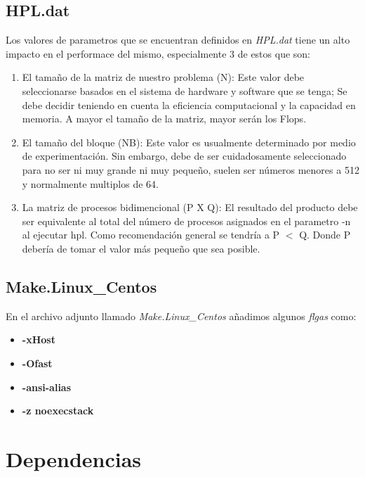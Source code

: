 \documentclass[conference]{IEEEtran}
\begin{document}
\subsection{HPL.dat}
Los valores de parametros que se encuentran definidos en \textit{HPL.dat} tiene
un alto impacto en el performace del mismo, especialmente 3 de estos que son:

\begin{enumerate}
    \item El tamaño de la matriz de nuestro problema (N): Este valor debe seleccionarse basados
    en el sistema de hardware y software que se tenga; Se debe decidir teniendo en cuenta la 
    eficiencia computacional y la capacidad en memoria. A mayor el tamaño de la matriz, mayor 
    serán los Flops.
    
    \item El tamaño del bloque (NB): Este valor es usualmente determinado por medio de experimentación.
    Sin embargo, debe de ser cuidadosamente seleccionado para no ser ni muy grande ni muy pequeño, suelen 
    ser números menores a 512 y normalmente multiplos de 64.
    
    \item La matriz de procesos bidimencional (P X Q): El resultado del producto debe ser equivalente al total
    del número de procesos asignados en el parametro -n al ejecutar hpl. Como recomendación general se tendría
    a P $<$ Q. Donde P debería de tomar el valor más pequeño que sea posible.
\end{enumerate}

\subsection{Make.Linux_Centos}

En el archivo adjunto llamado \textit{Make.Linux_Centos} añadimos algunos \textit{flgas} como:

\begin{itemize}
    \item \textbf{-xHost}
    \item \textbf{-Ofast}
    \item \textbf{-ansi-alias}
    \item \textbf{-z noexecstack}
\end{itemize}
    
\section{Dependencias}
\end{document}
